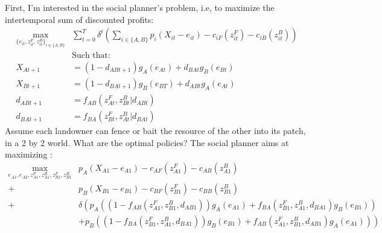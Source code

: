 \documentclass{article}
\begin{document}
First, I'm interested in the social planner's problem, i.e, to maximize the intertemporal sum of discounted profits:
\begin{align*}
    \max_{\{e_{it}, z_{it}^F, z_{it}^B \}_{i \in \{A,B\}}} & \sum_{t=0}^T \delta^t \left( \sum_{i \in \{A,B\}} p_i(X_{it} - e_{it}) - c_{iF}(z_{it}^F) - c_{iB}(z_{it}^B) \right)\\
     &\text{Such that:}\\
        X_{At+1} &= (1-d_{ABt+1})g_A(e_{At})+d_{BAt}g_B(e_{Bt})
    \\
    X_{Bt+1} &= (1 - d_{BAt+1})g_B(e_{BT}) + d_{ABt}g_A(e_{At})\\
     d_{ABt+1} &= f_{AB}(z^F_{At}, z^B_{Bt}| d_{ABt}) \\
    d_{BAt+1} &= f_{BA}(z^F_{Bt}, z^B_{At}| d_{BAt}) 
\end{align*}
Assume each landowner can fence or bait the resource of the other into its patch, in a 2 by 2 world. What are the optimal policies? The social planner aims at maximizing : 
\begin{align*}
\max_{e_{A1}, e_{A2}, z_{A1}^F, z_{A1}^B, z_{B1}^F, z_{B1}^B}&p_A(X_{A1}-e_{A1}) - c_{AF}(z_{A1}^F) - c_{AB}(z_{A1}^B) \\
+ &p_B(X_{B1}-e_{B1}) - c_{BF}(z_{B1}^F) - c_{BB}(z_{B1}^B) \\
+ & \delta \left(p_A((1-f_{AB}(z_{A1}^F, z_{B1}^B, d_{AB1}))g_A(e_{A1}) + f_{BA}(z_{B1}^F, z_{A1}^B, d_{BA1})g_B(e_{B1}))\right.\\
& + \left. p_B((1-f_{BA}(z_{B1}^F, z_{A1}^B, d_{BA1}))g_B(e_{B1}) + f_{AB}(z_{A1}^F, z_{B1}^B, d_{AB1})g_A(e_{A1})) \right)
\end{align*}
\end{document}

